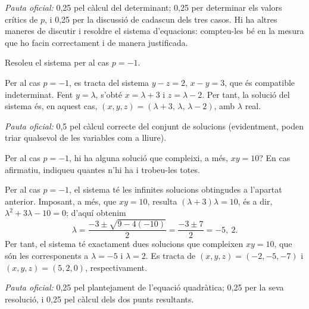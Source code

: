 \begin{apartats}
\begin{solucio}
\textit{Pauta oficial:} 0,25 pel càlcul del determinant; 0,25 per determinar els valors crítics de $p$, i 0,25
per la discussió de cadascun dels tres casos. Hi ha altres maneres de discutir i resoldre el sistema
d'equacions: compteu-les bé en la mesura que ho facin correctament i de manera justificada.
\end{solucio}

Resoleu el sistema per al cas $p=-1$.

\begin{solucio}
Per al cas $p=-1$, es tracta del sistema $y-z=2$, $x-y=3$, que és compatible indeterminat. Fent $y=\lambda$,
s'obté $x=\lambda+3$ i $z=\lambda-2$. Per tant, la solució del sistema és, en aquest cas,
$(x,y,z)=(\lambda+3,\,\lambda,\,\lambda-2)$, amb $\lambda$ real.

\textit{Pauta oficial:} 0,5 pel càlcul correcte del conjunt de solucions (evidentment, poden triar qualsevol
de les variables com a lliure).
\end{solucio}

Per al cas $p=-1$, hi ha alguna solució que compleixi, a més, $xy=10$? En cas afirmatiu, indiqueu quantes
n'hi ha i trobeu-les totes.

\begin{solucio}
Per al cas $p=-1$, el sistema té les infinites solucions obtingudes a l'apartat anterior. Imposant, a més,
que $xy=10$, resulta $(\lambda+3)\lambda=10$, és a dir, $\lambda^2+3\lambda-10=0$; d'aquí obtenim
\[
\lambda=\frac{-3\pm\sqrt{9-4(-10)}}{2}=\frac{-3\pm7}{2}=-5,\ 2 .
\]
Per tant, el sistema té exactament dues solucions que compleixen $xy=10$, que són les corresponents a
$\lambda=-5$ i $\lambda=2$. Es tracta de $(x,y,z)=(-2,-5,-7)$ i $(x,y,z)=(5,2,0)$, respectivament.

\textit{Pauta oficial:} 0,25 pel plantejament de l'equació quadràtica; 0,25 per la seva resolució, i 0,25 pel
càlcul dels dos punts resultants.
\end{solucio}

\end{apartats}
